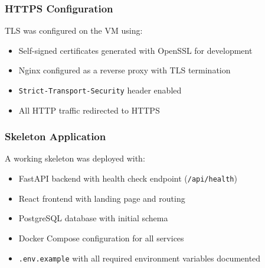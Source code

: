 \subsubsection{HTTPS Configuration}

TLS was configured on the VM using:
\begin{itemize}
    \item Self-signed certificates generated with OpenSSL for development
    \item Nginx configured as a reverse proxy with TLS termination
    \item \texttt{Strict-Transport-Security} header enabled
    \item All HTTP traffic redirected to HTTPS
\end{itemize}

\subsubsection{Skeleton Application}

A working skeleton was deployed with:
\begin{itemize}
    \item FastAPI backend with health check endpoint (\texttt{/api/health})
    \item React frontend with landing page and routing
    \item PostgreSQL database with initial schema
    \item Docker Compose configuration for all services
    \item \texttt{.env.example} with all required environment variables documented
\end{itemize}
